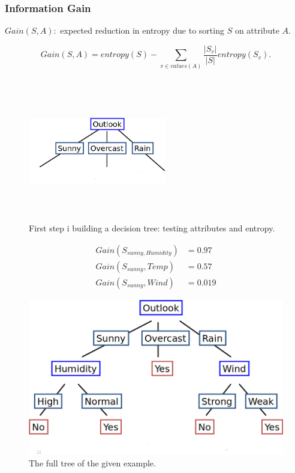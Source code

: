\documentclass{beamer}
\begin{document}
\begin{frame}
    \frametitle{Information Gain}

$Gain(S,A):$ expected reduction in entropy due to sorting $S$ on attribute $A$.

\begin{equation}
    Gain(S,A)=entropy(S)-\sum_{v\in values(A)}\frac{\vert S_v\vert }{\vert S\vert} entropy(S_v).
\end{equation}


\end{frame}


\begin{frame}[allowframebreaks]
    \frametitle{}

    \begin{figure}[]
        \centering
        \includegraphics[width=60mm,height=60mm,keepaspectratio]{assets/images/step1.png}
        \caption{First step i building a decision tree: testing attributes and entropy.}
        \label{}
    \end{figure}

\begin{align*}
    Gain(S_{sunny, Humidity})&=0.97 \\
    Gain(S_{sunny},Temp)&=0.57 \\
    Gain(S_{sunny},Wind)&=0.019
\end{align*}

\begin{figure}[]
    \centering
    \includegraphics[width=\textwidth,height=\textheight,keepaspectratio]{assets/images/fulltree.png}
    \caption{The full tree of the given example.}
    \label{}
\end{figure}

\end{frame}
\end{document}
